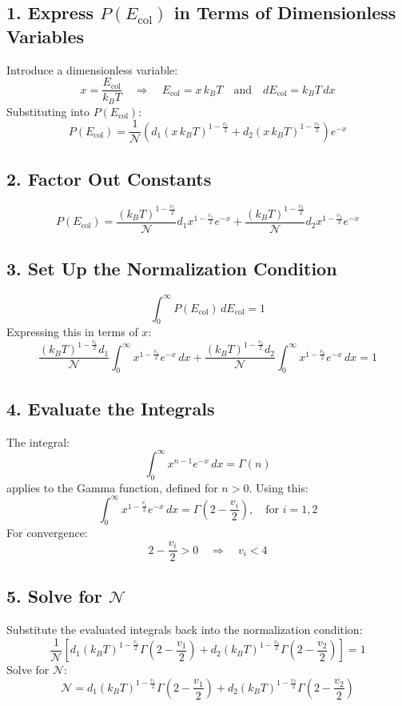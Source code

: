 \subsection*{1. Express \( P(E_{\text{col}}) \) in Terms of Dimensionless Variables}
Introduce a dimensionless variable:
\[
x = \frac{E_{\text{col}}}{k_B T} \quad \Rightarrow \quad E_{\text{col}} = x \, k_B T \quad \text{and} \quad dE_{\text{col}} = k_B T \, dx
\]
Substituting into \( P(E_{\text{col}}) \):
\[
P(E_{\text{col}}) = \frac{1}{\mathcal{N}} \left( d_1 (x \, k_B T)^{1 - \frac{v_1}{2}} + d_2 (x \, k_B T)^{1 - \frac{v_2}{2}} \right) e^{-x}
\]

\subsection*{2. Factor Out Constants}
\[
P(E_{\text{col}}) = \frac{(k_B T)^{1 - \frac{v_1}{2}}}{\mathcal{N}} d_1 x^{1 - \frac{v_1}{2}} e^{-x} + \frac{(k_B T)^{1 - \frac{v_2}{2}}}{\mathcal{N}} d_2 x^{1 - \frac{v_2}{2}} e^{-x}
\]

\subsection*{3. Set Up the Normalization Condition}
\[
\int_{0}^{\infty} P(E_{\text{col}}) \, dE_{\text{col}} = 1
\]
Expressing this in terms of \( x \):
\[
\frac{(k_B T)^{1 - \frac{v_1}{2}} d_1}{\mathcal{N}} \int_{0}^{\infty} x^{1 - \frac{v_1}{2}} e^{-x} \, dx + \frac{(k_B T)^{1 - \frac{v_2}{2}} d_2}{\mathcal{N}} \int_{0}^{\infty} x^{1 - \frac{v_2}{2}} e^{-x} \, dx = 1
\]

\subsection*{4. Evaluate the Integrals}
The integral:
\[
\int_{0}^{\infty} x^{n-1} e^{-x} \, dx = \Gamma(n)
\]
applies to the Gamma function, defined for \( n > 0 \). Using this:
\[
\int_{0}^{\infty} x^{1 - \frac{v_i}{2}} e^{-x} \, dx = \Gamma\left(2 - \frac{v_i}{2}\right), \quad \text{for } i = 1, 2
\]
For convergence:
\[
2 - \frac{v_i}{2} > 0 \quad \Rightarrow \quad v_i < 4
\]

\subsection*{5. Solve for \( \mathcal{N} \)}
Substitute the evaluated integrals back into the normalization condition:
\[
\frac{1}{\mathcal{N}} \left[ d_1 (k_B T)^{1 - \frac{v_1}{2}} \Gamma\left(2 - \frac{v_1}{2}\right) + d_2 (k_B T)^{1 - \frac{v_2}{2}} \Gamma\left(2 - \frac{v_2}{2}\right) \right] = 1
\]
Solve for \( \mathcal{N} \):
\[
\mathcal{N} = d_1 (k_B T)^{1 - \frac{v_1}{2}} \Gamma\left(2 - \frac{v_1}{2}\right) + d_2 (k_B T)^{1 - \frac{v_2}{2}} \Gamma\left(2 - \frac{v_2}{2}\right)
\]


